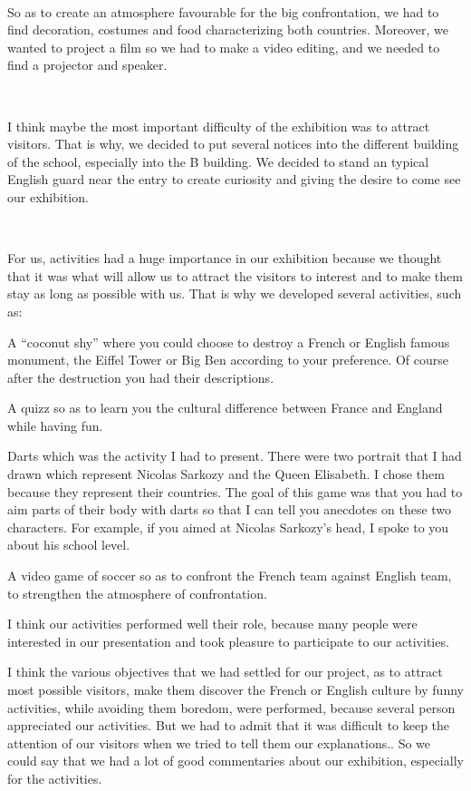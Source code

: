 \documentclass[11pt;a4paper]{report}
\begin{document}
~

So as to create an atmosphere favourable for the big confrontation, we had to find decoration, costumes and food characterizing both countries. Moreover, we wanted to project a film so we had to make a video editing, and we needed to find a projector and speaker.

~

I think maybe the most important difficulty of the exhibition was to attract visitors. That is why, we decided to put several notices into the different building of the school, especially into the B building. We decided to stand an typical English guard near the entry to create curiosity and giving the desire to come see our exhibition.        

~

For us, activities had a huge importance in our exhibition because we thought that it was what will allow us to attract the visitors to interest and to make them stay as long as possible with us. That is why we developed several activities, such as:

 A “coconut shy” where you could choose to destroy a French or English famous monument, the Eiffel Tower or Big Ben according to your preference. Of course after the destruction you had their descriptions. 

A quizz so as to learn you the cultural difference between France and England while having fun.

Darts which was the activity I had to present. There were two portrait that I had drawn which represent Nicolas Sarkozy and the Queen Elisabeth. I chose them because they represent their countries. The goal of this game was that you had to aim parts of their body with darts so that I can tell you anecdotes on these two characters. For example, if you aimed at Nicolas Sarkozy's head, I spoke to you about his school level. 

A video game of soccer so as to confront the French team against English team, to  strengthen the atmosphere of confrontation.

I think our activities performed well their role, because many people were interested in our presentation and took pleasure to participate to our activities.  

I think the various objectives that we had settled for our project, as to attract most possible visitors, make them discover the French or English culture by funny activities, while avoiding them boredom, were performed, because several person appreciated our activities. But we had to admit that it was difficult to keep the attention of our visitors when we tried to tell them our explanations.. So we could say that we had a lot of good commentaries about our exhibition, especially for the activities.
\end{document}
